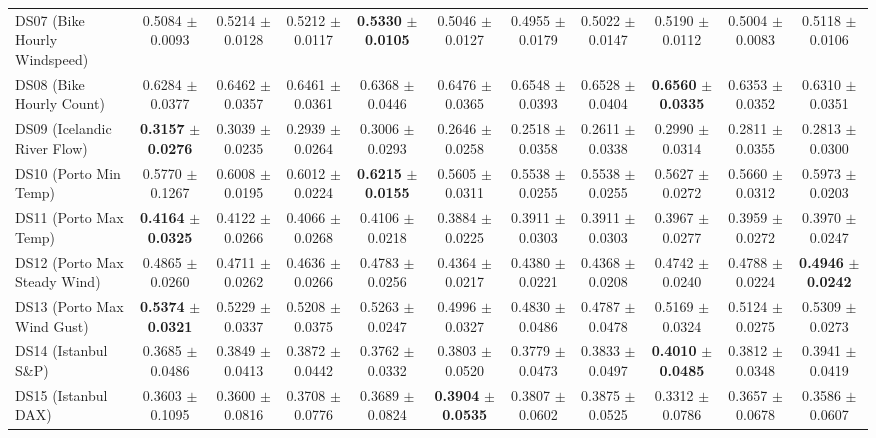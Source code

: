\begin{table}[t]
{{\begin{tabular}{lcccccccccc}
DS07 (Bike Hourly Windspeed) & 0.5084 $\pm$ 0.0093 & 0.5214 $\pm$ 0.0128 & 0.5212 $\pm$ 0.0117 & \textbf{0.5330} $\pm$ \textbf{0.0105} & 0.5046 $\pm$ 0.0127 & 0.4955 $\pm$ 0.0179 & 0.5022 $\pm$ 0.0147 & 0.5190 $\pm$ 0.0112 & 0.5004 $\pm$ 0.0083 & 0.5118 $\pm$ 0.0106 \\
DS08 (Bike Hourly Count) & 0.6284 $\pm$ 0.0377 & 0.6462 $\pm$ 0.0357 & 0.6461 $\pm$ 0.0361 & 0.6368 $\pm$ 0.0446 & 0.6476 $\pm$ 0.0365 & 0.6548 $\pm$ 0.0393 & 0.6528 $\pm$ 0.0404 & \textbf{0.6560} $\pm$ \textbf{0.0335} & 0.6353 $\pm$ 0.0352 & 0.6310 $\pm$ 0.0351 \\
DS09 (Icelandic River Flow) & \textbf{0.3157} $\pm$ \textbf{0.0276} & 0.3039 $\pm$ 0.0235 & 0.2939 $\pm$ 0.0264 & 0.3006 $\pm$ 0.0293 & 0.2646 $\pm$ 0.0258 & 0.2518 $\pm$ 0.0358 & 0.2611 $\pm$ 0.0338 & 0.2990 $\pm$ 0.0314 & 0.2811 $\pm$ 0.0355 & 0.2813 $\pm$ 0.0300 \\
DS10 (Porto Min Temp) & 0.5770 $\pm$ 0.1267 & 0.6008 $\pm$ 0.0195 & 0.6012 $\pm$ 0.0224 & \textbf{0.6215} $\pm$ \textbf{0.0155} & 0.5605 $\pm$ 0.0311 & 0.5538 $\pm$ 0.0255 & 0.5538 $\pm$ 0.0255 & 0.5627 $\pm$ 0.0272 & 0.5660 $\pm$ 0.0312 & 0.5973 $\pm$ 0.0203 \\
DS11 (Porto Max Temp) & \textbf{0.4164} $\pm$ \textbf{0.0325} & 0.4122 $\pm$ 0.0266 & 0.4066 $\pm$ 0.0268 & 0.4106 $\pm$ 0.0218 & 0.3884 $\pm$ 0.0225 & 0.3911 $\pm$ 0.0303 & 0.3911 $\pm$ 0.0303 & 0.3967 $\pm$ 0.0277 & 0.3959 $\pm$ 0.0272 & 0.3970 $\pm$ 0.0247 \\
DS12 (Porto Max Steady Wind) & 0.4865 $\pm$ 0.0260 & 0.4711 $\pm$ 0.0262 & 0.4636 $\pm$ 0.0266 & 0.4783 $\pm$ 0.0256 & 0.4364 $\pm$ 0.0217 & 0.4380 $\pm$ 0.0221 & 0.4368 $\pm$ 0.0208 & 0.4742 $\pm$ 0.0240 & 0.4788 $\pm$ 0.0224 & \textbf{0.4946} $\pm$ \textbf{0.0242} \\
DS13 (Porto Max Wind Gust) & \textbf{0.5374} $\pm$ \textbf{0.0321} & 0.5229 $\pm$ 0.0337 & 0.5208 $\pm$ 0.0375 & 0.5263 $\pm$ 0.0247 & 0.4996 $\pm$ 0.0327 & 0.4830 $\pm$ 0.0486 & 0.4787 $\pm$ 0.0478 & 0.5169 $\pm$ 0.0324 & 0.5124 $\pm$ 0.0275 & 0.5309 $\pm$ 0.0273 \\
DS14 (Istanbul S\&P) & 0.3685 $\pm$ 0.0486 & 0.3849 $\pm$ 0.0413 & 0.3872 $\pm$ 0.0442 & 0.3762 $\pm$ 0.0332 & 0.3803 $\pm$ 0.0520 & 0.3779 $\pm$ 0.0473 & 0.3833 $\pm$ 0.0497 & \textbf{0.4010} $\pm$ \textbf{0.0485} & 0.3812 $\pm$ 0.0348 & 0.3941 $\pm$ 0.0419 \\
DS15 (Istanbul DAX) & 0.3603 $\pm$ 0.1095 & 0.3600 $\pm$ 0.0816 & 0.3708 $\pm$ 0.0776 & 0.3689 $\pm$ 0.0824 & \textbf{0.3904} $\pm$ \textbf{0.0535} & 0.3807 $\pm$ 0.0602 & 0.3875 $\pm$ 0.0525 & 0.3312 $\pm$ 0.0786 & 0.3657 $\pm$ 0.0678 & 0.3586 $\pm$ 0.0607 \\

\end{tabular}}}
\end{table}
